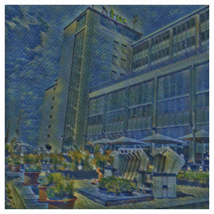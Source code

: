 \begin{figure}[H]
\begin{subfigure}[h]{0.15\textwidth}
    \end{subfigure}
    \begin{subfigure}[h]{0.15\textwidth}
        \centering
        \includegraphics[width=\textwidth]{resources/content/experiments/net6.jpg}
    \end{subfigure} \\
    

\end{figure}

